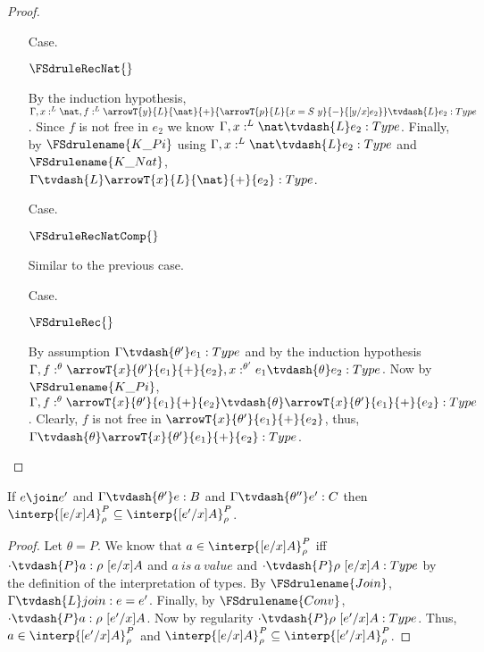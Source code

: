 \begin{proof}
\begin{itemize}
  \item[Case.] \ \\
    \begin{center}
      $\FSdruleRecNat{}$
    \end{center}
    By the induction hypothesis, 
    $\Gamma, x:^L \nat,
    f:^L \arrowT{y}{L}{\nat}{+}{\arrowT{p}{L}{x=S\ y}{-}{[y/x]e_2}} \tvdash{L} e_2:Type$.  Since
    $f$ is not free in $e_2$ we know $\Gamma, x:^L \nat \tvdash{L} e_2:Type$.  Finally,
    by $\FSdrulename{K\_Pi}$ using $\Gamma, x:^L \nat \tvdash{L} e_2:Type$ and
    $\FSdrulename{K\_Nat}$, $\Gamma \tvdash{L} \arrowT{x}{L}{\nat}{+}{e_2}:Type$.

  \item[Case.] \ \\
    \begin{center}
      $\FSdruleRecNatComp{}$
    \end{center}
    Similar to the previous case.

  \item[Case.] \ \\
    \begin{center}
      $\FSdruleRec{}$
    \end{center}
    By assumption $\Gamma \tvdash{\theta'} e_1:Type$ and by the induction hypothesis
    $\Gamma, f:^\theta \arrowT{x}{\theta'}{e_1}{+}{e_2},x:^{\theta'} e_1 \tvdash{\theta} e_2:Type$.
    Now by $\FSdrulename{K\_Pi}$, $\Gamma, f:^\theta \arrowT{x}{\theta'}{e_1}{+}{e_2} 
    \tvdash{\theta} \arrowT{x}{\theta'}{e_1}{+}{e_2}:Type$. Clearly, $f$ is not free in
    $\arrowT{x}{\theta'}{e_1}{+}{e_2}$, thus, 
    $\Gamma \tvdash{\theta} \arrowT{x}{\theta'}{e_1}{+}{e_2}:Type$.

  \end{itemize}
\end{proof}

\begin{lemma}
  \label{lemma:pconv_in_interp_are_equiv}
  If $e \join e'$ and $\Gamma \tvdash{\theta'} e:B$ and 
  $\Gamma \tvdash{\theta''} e':C$ then 
  $\interp{[e/x]A}^P_\rho \subseteq \interp{[e'/x]A}^P_\rho$.
\end{lemma}
\begin{proof}
  Let $\theta = P$.  We know that $a \in \interp{[e/x]A}^P_\rho$
  iff $\cdot \tvdash{P} a:\rho\ [e/x]A$ and $a\ is\ a\ value$ and $
  \cdot \tvdash{P} \rho\ [e/x]A:Type$ 
  by the definition of the interpretation of types.
  By $\FSdrulename{Join}$, $\Gamma \tvdash{L} join:e = e'$. Finally, by 
  $\FSdrulename{Conv}$, 
  $\cdot \tvdash{P} a:\rho\ [e'/x]A$.  Now by regularity $\cdot \tvdash{P} \rho\ [e'/x]A:Type$.
  Thus, $a \in \interp{[e'/x]A}^P_\rho$ and
  $\interp{[e/x]A}^P_\rho \subseteq \interp{[e'/x]A}^P_\rho$.
\end{proof}

